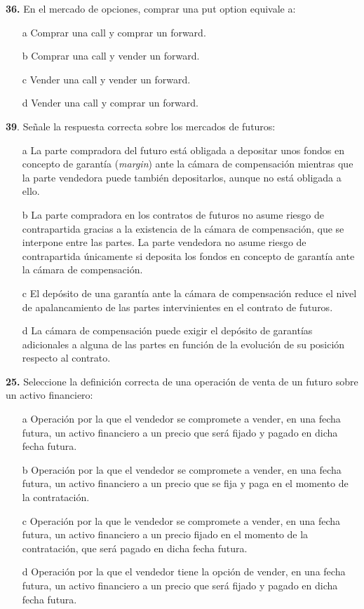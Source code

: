 \documentclass{nuevotema}
\begin{document}

\textbf{36.} En el mercado de opciones, comprar una put option equivale a:

\begin{itemize}
	\item[a] Comprar una call y comprar un forward.
	\item[b] Comprar una call y vender un forward.
	\item[c] Vender una call y vender un forward.
	\item[d] Vender una call y comprar un forward.
\end{itemize}


\textbf{39}. Señale la respuesta correcta sobre los mercados de futuros:

\begin{enumerate}
    \item[a] La parte compradora del futuro está obligada a depositar unos fondos en concepto de garantía (\textit{margin}) ante la cámara de compensación mientras que la parte vendedora puede también depositarlos, aunque no está obligada a ello.
    \item[b] La parte compradora en los contratos de futuros no asume riesgo de contrapartida gracias a la existencia de la cámara de compensación, que se interpone entre las partes. La parte vendedora no asume riesgo de contrapartida únicamente si deposita los fondos en concepto de garantía ante la cámara de compensación.
    \item[c] El depósito de una garantía ante la cámara de compensación reduce el nivel de apalancamiento de las partes intervinientes en el contrato de futuros.
    \item[d] La cámara de compensación puede exigir el depósito de garantías adicionales a alguna de las partes en función de la evolución de su posición respecto al contrato.
\end{enumerate}


\textbf{25.} Seleccione la definición correcta de una operación de venta de un futuro sobre un activo financiero:

\begin{itemize}
	\item[a] Operación por la que el vendedor se compromete a vender, en una fecha futura, un activo financiero a un precio que será fijado y pagado en dicha fecha futura.
	\item[b] Operación por la que el vendedor se compromete a vender, en una fecha futura, un activo financiero a un precio que se fija y paga en el momento de la contratación.
	\item[c] Operación por la que le vendedor se compromete a vender, en una fecha futura, un activo financiero a un precio fijado en el momento de la contratación, que será pagado en dicha fecha futura.
	\item[d] Operación por la que el vendedor tiene la opción de vender, en una fecha futura, un activo financiero a un precio que será fijado y pagado en dicha fecha futura.
\end{itemize}
\end{document}
